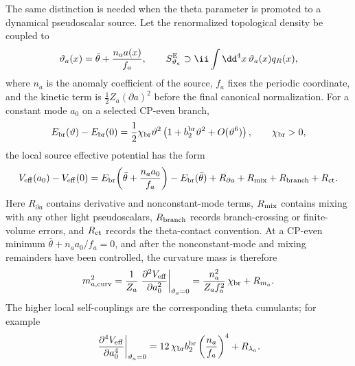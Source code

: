 \begin{controlledapproximation}
\label{ca:dynamical-theta-source-axion-curvature}
The same distinction is needed when the theta parameter is promoted to a
dynamical pseudoscalar source.  Let the renormalized topological density be
coupled to
\begin{equation}
  \vartheta_a(x)
  =
  \bar\theta+\frac{n_a a(x)}{f_a},
  \qquad
  S_{\vartheta_a}^{\rm E}
  \supset
  \ii\int\dd^4x\,\vartheta_a(x)q_R(x),
  \label{eq:dynamical-theta-source-coordinate}
\end{equation}
where \(n_a\) is the anomaly coefficient of the source, \(f_a\) fixes the
periodic coordinate, and the kinetic term is
\(\frac12 Z_a(\partial a)^2\) before the final canonical normalization.  For a
constant mode \(a_0\) on a selected CP-even branch,
\begin{equation}
  E_{\rm br}(\vartheta)-E_{\rm br}(0)
  =
  \frac12\chi_{\rm br}\vartheta^2
  \left(1+b_2^{\rm br}\vartheta^2+O(\vartheta^6)\right),
  \qquad
  \chi_{\rm br}>0 ,
  \label{eq:branch-theta-expansion-for-axion}
\end{equation}
the local source effective potential has the form
\begin{equation}
  V_{\rm eff}(a_0)-V_{\rm eff}(0)
  =
  E_{\rm br}\!\left(\bar\theta+\frac{n_a a_0}{f_a}\right)
  -E_{\rm br}(\bar\theta)
  +R_{\partial a}+R_{\rm mix}+R_{\rm branch}+R_{\rm ct}.
  \label{eq:dynamical-theta-effective-potential}
\end{equation}
Here \(R_{\partial a}\) contains derivative and nonconstant-mode terms,
\(R_{\rm mix}\) contains mixing with any other light pseudoscalars,
\(R_{\rm branch}\) records branch-crossing or finite-volume errors, and
\(R_{\rm ct}\) records the theta-contact convention.  At a CP-even minimum
\(\bar\theta+n_a a_0/f_a=0\), and after the nonconstant-mode and mixing
remainders have been controlled, the curvature mass is therefore
\begin{equation}
  m_{a,{\rm curv}}^2
  =
  \frac1{Z_a}
  \left.
  \frac{\partial^2 V_{\rm eff}}{\partial a_0^2}
  \right|_{\vartheta_a=0}
  =
  \frac{n_a^2}{Z_a f_a^2}\,\chi_{\rm br}
  +
  R_{m_a}.
  \label{eq:axion-curvature-from-theta-susceptibility}
\end{equation}
The higher local self-couplings are the corresponding theta cumulants; for
example
\begin{equation}
  \left.
  \frac{\partial^4 V_{\rm eff}}{\partial a_0^4}
  \right|_{\vartheta_a=0}
  =
  12\,\chi_{\rm br}b_2^{\rm br}
  \left(\frac{n_a}{f_a}\right)^4
  +
  R_{\lambda_a}.
  \label{eq:axion-quartic-from-theta-cumulant}
\end{equation}


\end{controlledapproximation}
